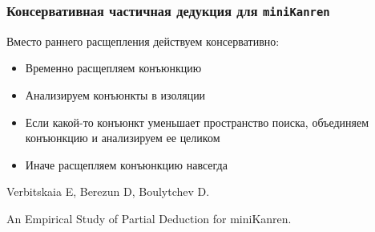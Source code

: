 \documentclass{beamer}
\newcommand{\miniKanren}{\texttt{miniKanren}}
\begin{document}
\begin{frame}[fragile]
  \frametitle{Консервативная частичная дедукция для \miniKanren}
\begin{center}
  Вместо раннего расщепления действуем консервативно:
\end{center}

\begin{itemize}
  \item Временно расщепляем конъюнкцию
  \item Анализируем конъюнкты в изоляции
  \item Если какой-то конъюнкт уменьшает пространство поиска, объединяем конъюнкцию и анализируем ее целиком
  \item Иначе расщепляем конъюнкцию навсегда
\end{itemize}

\vfill

\begin{center}
  Verbitskaia E, Berezun D, Boulytchev D.

  An Empirical Study of Partial Deduction for miniKanren.
\end{center}

\end{frame}
\end{document}
